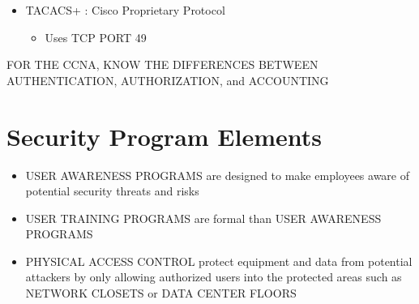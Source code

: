 \begin{itemize}
\begin{itemize}
    \begin{itemize}
    \tightlist
    \item
      Uses UDP PORTS 1812 and 1813
    \end{itemize}
  \item
    TACACS+ : Cisco Proprietary Protocol

    \begin{itemize}
    \tightlist
    \item
      Uses TCP PORT 49
    \end{itemize}
  \end{itemize}
\end{itemize}

\begin{tipbox}

FOR THE CCNA, KNOW THE DIFFERENCES BETWEEN AUTHENTICATION,
AUTHORIZATION, and ACCOUNTING

\end{tipbox}

\section{Security Program Elements}\label{security-program-elements}

\begin{itemize}
\tightlist
\item
  USER AWARENESS PROGRAMS are designed to make employees aware of
  potential security threats and risks
\item
  USER TRAINING PROGRAMS are formal than USER AWARENESS PROGRAMS
\item
  PHYSICAL ACCESS CONTROL protect equipment and data from potential
  attackers by only allowing authorized users into the protected areas
  such as NETWORK CLOSETS or DATA CENTER FLOORS
\end{itemize}
